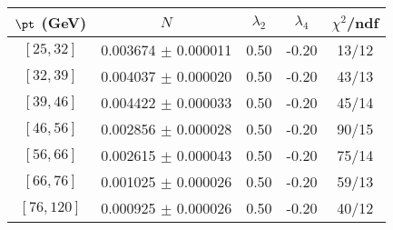 \begin{tabular}{c||c|c|c|c}
$\pt$ (GeV) & $N$ & $\lambda_{2}$ & $\lambda_4$  & $\chi^2$/ndf  \\
\hline
$[25, 32]$ & 0.003674 $\pm$ 0.000011 & 0.50 & -0.20 & 13/12\\
$[32, 39]$ & 0.004037 $\pm$ 0.000020 & 0.50 & -0.20 & 43/13\\
$[39, 46]$ & 0.004422 $\pm$ 0.000033 & 0.50 & -0.20 & 45/14\\
$[46, 56]$ & 0.002856 $\pm$ 0.000028 & 0.50 & -0.20 & 90/15\\
$[56, 66]$ & 0.002615 $\pm$ 0.000043 & 0.50 & -0.20 & 75/14\\
$[66, 76]$ & 0.001025 $\pm$ 0.000026 & 0.50 & -0.20 & 59/13\\
$[76, 120]$ & 0.000925 $\pm$ 0.000026 & 0.50 & -0.20 & 40/12\\
\end{tabular}
